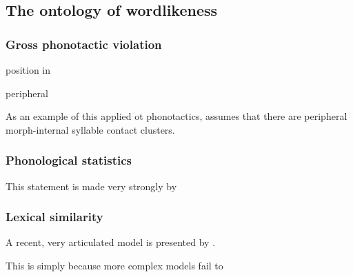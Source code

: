 \subsection{The ontology of wordlikeness}

\subsubsection{Gross phonotactic violation}

position in \citet{SPE}

\citet{Shibatani1972}
\citet{Hooper1973}

peripheral \citep[in the sense of][81]{LGB}

As an example of this applied ot phonotactics, 
\citet{Borowsky1989} assumes that there are peripheral morph-internal syllable contact clusters. 

\subsubsection{Phonological statistics}

\citet{SPE}

This statement is made very strongly by \citet{Coleman1997}

\subsubsection{Lexical similarity}

\citet{LSLT}

\citet{Greenberg1964}
\citet{Ohala1986b}

A recent, very articulated model is presented by \citet{Bailey2001}.

This is simply because more complex models fail to 

